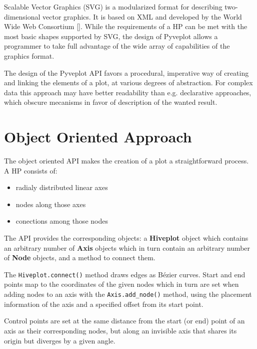 \documentclass{bioinfo}
\begin{document}
Scalable Vector Graphics (SVG) is a modularized format for describing
two-dimensional vector graphics. It is based on XML and developed by
the World Wide Web Consortium [\cite{McCormack:11:SVG}]. While the
requirements of a HP can be met with the most basic shapes supported
by SVG, the design of Pyveplot allows a programmer to take full
advantage of the wide array of capabilities of the graphics format.

The design of the Pyveplot API favors a procedural, imperative way of
creating and linking the elements of a plot, at various degrees of
abstraction. For complex data this approach may have better
readability than e.g. declarative approaches, which obscure mecanisms in
favor of description of the wanted result.

\section{Object Oriented Approach}

The object oriented API makes the creation of a plot a straightforward
process. A HP consists of:
\begin{itemize}
\item radialy distributed linear axes
\item nodes along those axes
\item conections among those nodes
\end{itemize}
The API provides the corresponding objects: a {\bfseries Hiveplot} object
which contains an arbitrary number of {\bfseries Axis} objects which in
turn contain an arbitrary number of {\bfseries Node} objects, and a method
to connect them.

The \verb"Hiveplot.connect()" method draws edges as B\'ezier curves.
Start and end points map to the coordinates of the given nodes which
in turn are set when adding nodes to an axis with the
\verb"Axis.add_node()" method, using the placement information of the
axis and a specified offset from its start point.

Control points are set at the same distance from the start (or end)
point of an axis as their corresponding nodes, but along an invisible
axis that shares its origin but diverges by a given angle.
\end{document}
